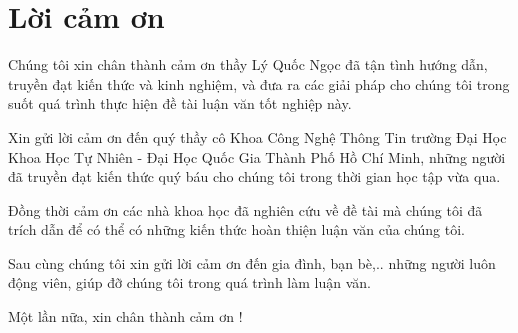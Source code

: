 \chapter*{Lời cảm ơn}
\label{thanks}


Chúng tôi xin chân thành cảm ơn thầy Lý Quốc Ngọc đã tận tình hướng dẫn, truyền đạt kiến thức và kinh nghiệm, và đưa ra các giải pháp cho chúng tôi trong suốt quá trình thực hiện đề tài luận văn tốt nghiệp này.

Xin gửi lời cảm ơn đến quý thầy cô Khoa Công Nghệ Thông Tin trường Đại Học Khoa Học Tự Nhiên - Đại Học Quốc Gia Thành Phố Hồ Chí Minh, những người đã truyền đạt kiến thức quý báu cho chúng tôi trong thời gian học tập vừa qua.

Đồng thời cảm ơn các nhà khoa học đã nghiên cứu về đề tài mà chúng tôi đã trích dẫn để có thể có những kiến thức hoàn thiện luận văn của chúng tôi.

Sau cùng chúng tôi xin gửi lời cảm ơn đến gia đình, bạn bè,.. những người luôn động viên, giúp đỡ chúng tôi trong quá trình làm luận văn. 

Một lần nữa, xin chân thành cảm ơn !